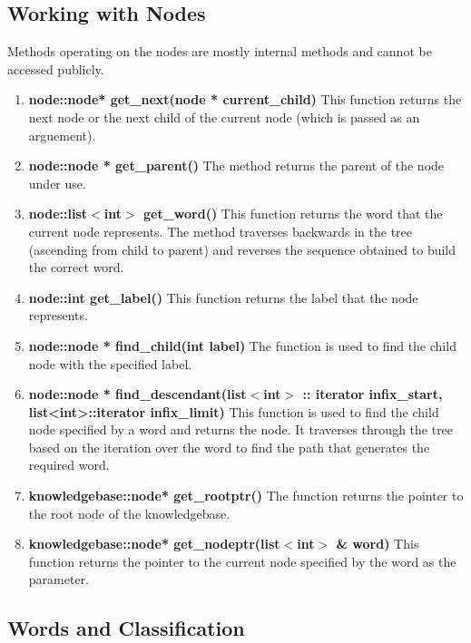 \subsection*{Working with Nodes}
Methods operating on the nodes are mostly internal methods and cannot be accessed publicly.
\begin{enumerate}
\item \textbf{node::node* get\_next(node * current\_child)} \vskip 1pt
This function returns the next node or the next child of the current node (which is passed as an arguement). 
	
\item \textbf{node::node * get\_parent()} \vskip 1pt
The method returns the parent of the node under use.

\item \textbf{node::list$<$int$>$ get\_word()} \vskip 1pt
This function returns the word that the current node represents. The method traverses backwards in the tree (ascending from child to parent) and reverses the sequence obtained to build the correct word.
	
\item \textbf{node::int get\_label()} \hfill \vskip 1pt
This function returns the label that the node represents.
	
\item \textbf{node::node * find\_child(int label)} \hfill \vskip 1pt
The function is used to find the child node with the specified label.
	
\item \textbf{node::node * find\_descendant(list$<$int$>$ :: iterator infix\_start, list<int>::iterator infix\_limit)} \hfill \vskip 1pt
This function is used to find the child node specified by a word and returns the node. It traverses through the tree based on the iteration over the word to find the path that generates the required word.
	
\item \textbf{knowledgebase::node* get\_rootptr()} \hfill \vskip 1pt
The function returns the pointer to the root node of the knowledgebase.
	
\item \textbf{knowledgebase::node* get\_nodeptr(list$<$int$>$ \& word)} \hfill \vskip 1pt
This function returns the pointer to the current node specified by the word as the parameter.
	
\end{enumerate}

\subsection*{Words and Classification}

